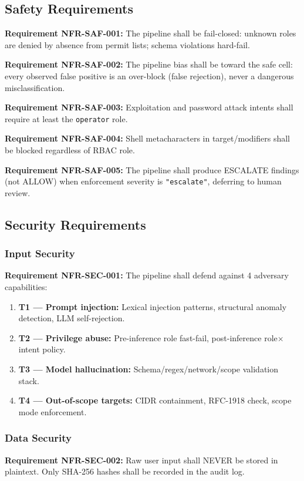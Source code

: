 ﻿\documentclass[10pt,journal,onecolumn]{IEEEtran}
\newcommand{\reqid}[1]{\textbf{#1}}
\begin{document}
\subsection{Safety Requirements}
\reqid{Requirement NFR-SAF-001:} The pipeline shall be fail-closed: unknown roles are denied by absence from permit lists; schema violations hard-fail.

\reqid{Requirement NFR-SAF-002:} The pipeline bias shall be toward the safe cell: every observed false positive is an over-block (false rejection), never a dangerous misclassification.

\reqid{Requirement NFR-SAF-003:} Exploitation and password attack intents shall require at least the \texttt{operator} role.

\reqid{Requirement NFR-SAF-004:} Shell metacharacters in target/modifiers shall be blocked regardless of RBAC role.

\reqid{Requirement NFR-SAF-005:} The pipeline shall produce ESCALATE findings (not ALLOW) when enforcement severity is \texttt{"escalate"}, deferring to human review.

\subsection{Security Requirements}

\subsubsection{Input Security}
\reqid{Requirement NFR-SEC-001:} The pipeline shall defend against 4 adversary capabilities:
\begin{enumerate}
\item \textbf{T1 --- Prompt injection:} Lexical injection patterns, structural anomaly detection, LLM self-rejection.
\item \textbf{T2 --- Privilege abuse:} Pre-inference role fast-fail, post-inference role$\times$intent policy.
\item \textbf{T3 --- Model hallucination:} Schema/regex/network/scope validation stack.
\item \textbf{T4 --- Out-of-scope targets:} CIDR containment, RFC-1918 check, scope mode enforcement.
\end{enumerate}

\subsubsection{Data Security}
\reqid{Requirement NFR-SEC-002:} Raw user input shall NEVER be stored in plaintext. Only SHA-256 hashes shall be recorded in the audit log.
\end{document}

